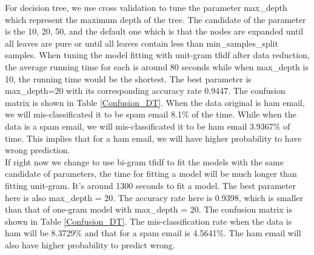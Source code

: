 
For decision tree, we use cross validation to tune the parameter max\_depth which represent the maximum depth of the tree. The candidate of the parameter is the 10, 20, 50, and the default one which is that the nodes are expanded until all leaves are pure or until all leaves contain less than min\_samples\_split samples. When tuning the model fitting with unit-gram tfidf after data reduction, the average running time for each is around 80 seconds while when max\_depth is 10, the running time would be the shortest. The best parameter is max\_depth=20 with its corresponding accuracy rate 0.9447. The confusion matrix is shown in Table \ref{Confusion_DT}. When the data original is ham email, we will mis-classificated it to be spam email 8.1\% of the time. While when the data is a spam email, we will mis-classificated it to be ham email 3.9367\% of time. This implies that for a ham email, we will have higher probability to have wrong prediction.\\

If right now we change to use bi-gram tfidf to fit the models with the same candidate of parameters, the time for fitting a model will be much longer than fitting unit-gram. It's around 1300 seconds to fit a model. The best parameter here is also max\_depth = 20. The accuracy rate here is 0.9398, which is smaller than that of one-gram model with max\_depth = 20. The confusion matrix is shown in Table \ref{Confusion_DT}. The mis-classification rate when the data is ham will be 8.3729\% and that for a spam email is 4.5641\%. The ham email will also have higher probability to predict wrong. 



